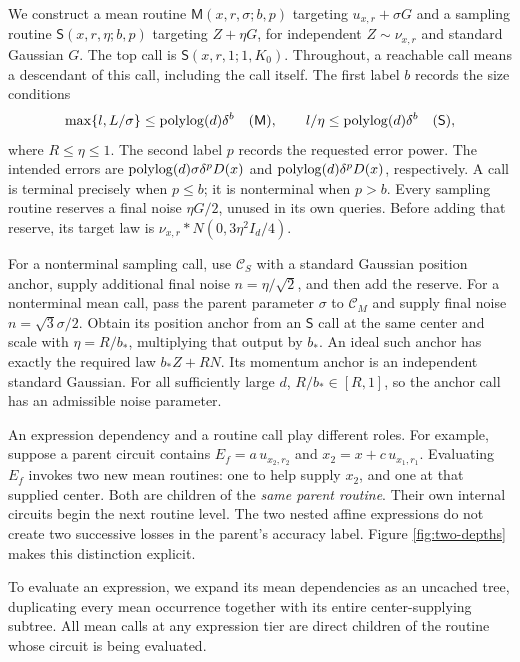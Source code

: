 We construct a mean routine $\mathsf M(x,r,\sigma;b,p)$ targeting
$u_{x,r}+\sigma G$ and a sampling routine
$\mathsf S(x,r,\eta;b,p)$ targeting $Z+\eta G$, for independent
$Z\sim\nu_{x,r}$ and standard Gaussian $G$.
The top call is $\mathsf S(x,r,1;1,K_0)$.  Throughout, a reachable
call means a descendant of this call, including the call itself.
The first label $b$ records the size conditions
\begin{equation}\label{eq:routine-sizes}
 \max\{l,L/\sigma\}\le\operatorname{polylog}(d)\delta^b\quad(\mathsf M),
 \qquad l/\eta\le\operatorname{polylog}(d)\delta^b\quad(\mathsf S),
\end{equation}
where $R\le\eta\le1$.  The second label $p$ records the requested
error power.  The intended errors are
$\operatorname{polylog}(d)\sigma\delta^pD(x)$ and
$\operatorname{polylog}(d)\delta^pD(x)$, respectively.
A call is terminal precisely when $p\le b$; it is nonterminal
when $p>b$.
Every sampling routine reserves a final noise $\eta G/2$, unused
in its own queries.  Before adding that reserve, its target law is
$\nu_{x,r}*N(0,3\eta^2I_d/4)$.

For a nonterminal sampling call, use $\mathcal C_S$ with a standard
Gaussian position anchor, supply additional final noise
$n=\eta/\sqrt2$, and then add the reserve.  For a nonterminal mean
call, pass the parent parameter $\sigma$ to $\mathcal C_M$ and supply
final noise $n=\sqrt3\sigma/2$.  Obtain its position anchor from an
$\mathsf S$ call at the same center and scale with
$\eta=R/b_*$, multiplying that output by $b_*$.  An ideal such
anchor has exactly the required law $b_*Z+RN$.
Its momentum anchor is an independent standard Gaussian.  For all
sufficiently large $d$, $R/b_*\in[R,1]$, so the anchor call has an
admissible noise parameter.

An expression dependency and a routine call play different roles.
For example, suppose a parent circuit contains
$E_f=a\,u_{x_2,r_2}$ and $x_2=x+c\,u_{x_1,r_1}$.
Evaluating $E_f$ invokes two new mean routines: one to help supply
$x_2$, and one at that supplied center.  Both are children of the
\emph{same parent routine}.  Their own internal circuits begin the
next routine level.  The two nested affine expressions do not create
two successive losses in the parent's accuracy label.  Figure
\ref{fig:two-depths} makes this distinction explicit.




To evaluate an expression, we expand its mean dependencies as an
uncached tree, duplicating every mean occurrence together with its
entire center-supplying subtree.  All mean calls at any expression tier
are direct children of the routine whose circuit is being evaluated.

